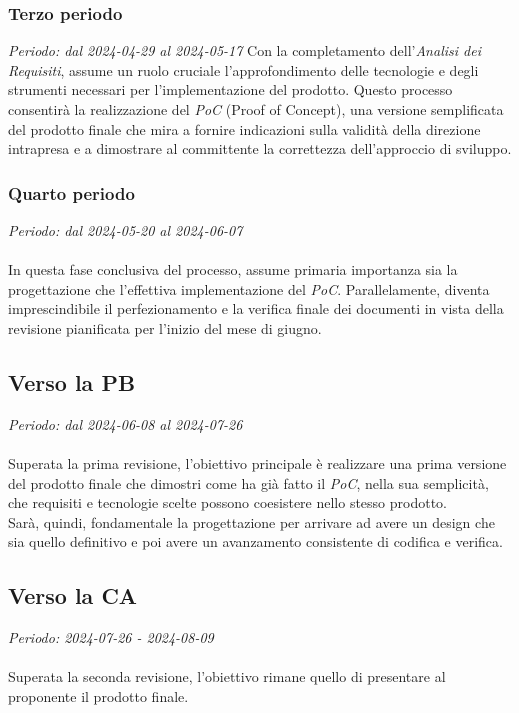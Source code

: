 \subsubsection{Terzo periodo}
\textit{Periodo: dal 2024-04-29 al 2024-05-17}
Con la completamento dell'\textit{Analisi dei Requisiti}, assume un ruolo cruciale l'approfondimento delle tecnologie e degli strumenti necessari per l'implementazione del prodotto. Questo processo consentirà la realizzazione del \textit{PoC} (Proof of Concept), una versione semplificata del prodotto finale che mira a fornire indicazioni sulla validità della direzione intrapresa e a dimostrare al committente la correttezza dell'approccio di sviluppo.

\subsubsection{Quarto periodo}
\textit{Periodo: dal 2024-05-20 al 2024-06-07}
\\\\
In questa fase conclusiva del processo, assume primaria importanza sia la progettazione che l'effettiva implementazione del \textit{PoC}. Parallelamente, diventa imprescindibile il perfezionamento e la verifica finale dei documenti in vista della revisione pianificata per l'inizio del mese di giugno.

\subsection{Verso la PB}
\textit{Periodo: dal 2024-06-08 al 2024-07-26}
\\\\
Superata la prima revisione, l'obiettivo principale è realizzare una prima versione del prodotto finale che dimostri come ha già fatto il \textit{PoC}, nella sua semplicità, 
che requisiti e tecnologie scelte possono coesistere nello stesso prodotto. 
\\
Sarà, quindi, fondamentale la progettazione per arrivare ad avere un design che sia quello definitivo e poi avere un avanzamento consistente di codifica e verifica.

\subsection{Verso la CA}
\textit{Periodo: 2024-07-26 - 2024-08-09}
\\\\
Superata la seconda revisione, l'obiettivo rimane quello di presentare al proponente il prodotto finale.